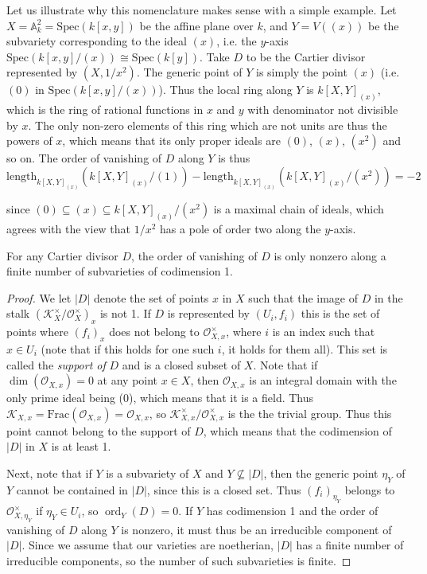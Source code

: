 \documentclass[a4paper,openany]{scrbook}
\DeclareMathOperator{\ord}{ord}
\begin{document}
\begin{example}
Let us illustrate why this nomenclature makes sense with a simple example. Let $X=\mathbb{A}_k^2=\mathrm{Spec}(k[x,y])$ be the affine plane over $k$, and $Y=V((x))$ be the subvariety corresponding to the ideal $(x)$, i.e. the $y$-axis $\mathrm{Spec}(k[x,y]/(x))\cong\mathrm{Spec}(k[y])$. Take $D$ to be the Cartier divisor represented by $(X,1/x^2)$. The generic point of $Y$ is simply the point $(x)$ (i.e. $(0)$ in $\mathrm{Spec}(k[x,y]/(x))$). Thus the local ring along $Y$ is $k[X,Y]_{(x)}$, which is the ring of rational functions in $x$ and $y$ with denominator not divisible by $x$. The only non-zero elements of this ring which are not units are thus the powers of $x$, which means that its only proper ideals are $(0)$, $(x)$, $(x^2)$ and so on. The order of vanishing of $D$ along $Y$ is thus
$$\mathrm{length}_{k[X,Y]_{(x)}}(k[X,Y]_{(x)}/(1))-\mathrm{length}_{k[X,Y]_{(x)}}(k[X,Y]_{(x)}/(x^2))=-2$$
\end{example}
since $(0)\subseteq(x)\subseteq k[X,Y]_{(x)}/(x^2)$ is a maximal chain of ideals, which agrees with the view that $1/x^2$ has a pole of order two along the $y$-axis.

\begin{prop}
For any Cartier divisor $D$, the order of vanishing of $D$ is only nonzero along a finite number of subvarieties of codimension 1.
\end{prop} 

\begin{proof}
We let $|D|$ denote the set of points $x$ in $X$ such that the image of $D$ in the stalk $(\mathscr{K}_X^\times/\mathscr{O}_X^\times)_x$ is not 1. If $D$ is represented by $(U_i,f_i)$ this is the set of points where $(f_i)_x$ does not belong to $\mathscr{O}_{X,x}^\times$, where $i$ is an index such that $x\in U_i$ (note that if this holds for one such $i$, it holds for them all). This set is called the \textit{support of} $D$ and is a closed subset of $X$. Note that if $\dim(\mathscr{O}_{X,x})=0$ at any point $x\in X$, then $\mathscr{O}_{X,x}$ is an integral domain with the only prime ideal being (0), which means that it is a field. Thus $\mathscr{K}_{X,x}=\mathrm{Frac}(\mathscr{O}_{X,x})=\mathscr{O}_{X,x}$, so $\mathscr{K}_{X,x}^\times/\mathscr{O}_{X,x}^\times$ is the the trivial group. Thus this point cannot belong to the support of $D$, which means that the codimension of $|D|$ in $X$ is at least 1.

Next, note that if $Y$ is a subvariety of $X$ and $Y\not\subseteq|D|$, then the generic point $\eta_Y$ of $Y$ cannot be contained in $|D|$, since this is a closed set. Thus $(f_i)_{\eta_Y}$ belongs to $\mathscr{O}_{X,\eta_Y}^\times$ if $\eta_Y\in U_i$, so $\ord_Y(D)=0$. If $Y$ has codimension 1 and the order of vanishing of $D$ along $Y$ is nonzero, it must thus be an irreducible component of $|D|$. Since we assume that our varieties are noetherian, $|D|$ has a finite number of irreducible components, so the number of such subvarieties is finite.
\end{proof}
\end{document}
